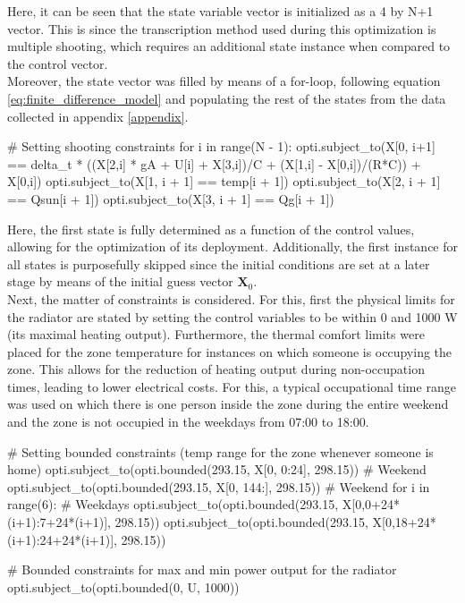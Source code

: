 Here, it can be seen that the state variable vector is initialized as a 4 by N+1 vector. This is since the transcription method used during this optimization is multiple shooting, which requires an additional state instance when compared to the control vector.\\

Moreover, the state vector was filled by means of a for-loop, following equation \ref{eq:finite_difference_model} and populating the rest of the states from the data collected in appendix \ref{appendix}.
\begin{python}
# Setting shooting constraints
for i in range(N - 1):
    opti.subject_to(X[0, i+1] == delta_t * ((X[2,i] * gA + U[i] + X[3,i])/C + (X[1,i] - X[0,i])/(R*C)) + X[0,i])
    opti.subject_to(X[1, i + 1] == temp[i + 1])
    opti.subject_to(X[2, i + 1] == Qsun[i + 1])
    opti.subject_to(X[3, i + 1] == Qg[i + 1])
\end{python}

Here, the first state is fully determined as a function of the control values, allowing for the optimization of its deployment. Additionally, the first instance for all states is purposefully skipped since the initial conditions are set at a later stage by means of the initial guess vector $\boldsymbol{X}_0$.\\

Next, the matter of constraints is considered. For this, first the physical limits for the radiator are stated by setting the control variables to be within 0 and 1000 W (its maximal heating output). Furthermore, the thermal comfort limits were placed for the zone temperature for instances on which someone is occupying the zone. This allows for the reduction of heating output during non-occupation times, leading to lower electrical costs. For this, a typical occupational time range was used on which there is one person inside the zone during the entire weekend and the zone is not occupied in the weekdays from 07:00 to 18:00.

\begin{python}
# Setting bounded constraints (temp range for the zone whenever someone is home)
opti.subject_to(opti.bounded(293.15, X[0, 0:24], 298.15))  # Weekend
opti.subject_to(opti.bounded(293.15, X[0, 144:], 298.15))  # Weekend
for i in range(6):  # Weekdays
   opti.subject_to(opti.bounded(293.15, X[0,0+24*(i+1):7+24*(i+1)], 298.15))
   opti.subject_to(opti.bounded(293.15, X[0,18+24*(i+1):24+24*(i+1)], 298.15))

# Bounded constraints for max and min power output for the radiator
opti.subject_to(opti.bounded(0, U, 1000))
\end{python}

